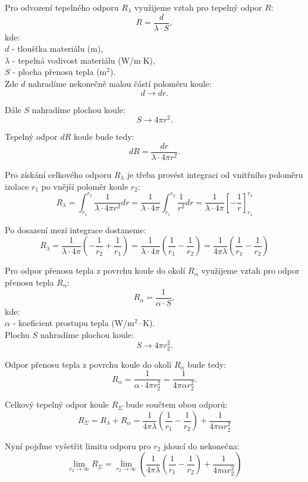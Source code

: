 \documentclass{article}
\begin{document}
Pro odvození tepelného odporu $R_{\lambda}$ využijeme vztah pro tepelný odpor $R$:
$$
    R = \frac{d}{\lambda \cdot S},
$$
kde:\\
$d$ - tloušťka materiálu (m),\\
$\lambda$ - tepelná vodivost materiálu (W/m$\cdot$K),\\
$S$ - plocha přenosu tepla (m$^2$).\\

Zde $d$ nahradíme nekonečně malou částí poloměru koule:
$$
    d \rightarrow dr.
$$

Dále $S$ nahradíme plochou koule:
$$
    S \rightarrow 4 \pi r^2.
$$

Tepelný odpor $dR$ koule bude tedy:
$$
    dR = \frac{dr}{\lambda \cdot 4 \pi r^2}.
$$

Pro získání celkového odporu $R_{\lambda}$ je třeba provést integraci od vnitřního poloměru izolace $r_1$ po vnější poloměr koule $r_2$:
$$
    R_{\lambda} = \int_{r_1}^{r_2} \frac{1}{\lambda \cdot 4 \pi r^2} dr = \frac{1}{\lambda \cdot 4 \pi} \int_{r_1}^{r_2} \frac{1}{r^2} dr = \frac{1}{\lambda \cdot 4 \pi} \left[ -\frac{1}{r} \right]_{r_1}^{r_2}
$$

Po dosazení mezí integrace dostaneme:
$$
    R_{\lambda} = \frac{1}{\lambda \cdot 4 \pi} \left( -\frac{1}{r_2} + \frac{1}{r_1} \right) = \frac{1}{\lambda \cdot 4 \pi} \left( \frac{1}{r_1} - \frac{1}{r_2} \right) = \frac{1}{4 \pi \lambda} \left( \frac{1}{r_1} - \frac{1}{r_2} \right)
$$

Pro odpor přenosu tepla z povrchu koule do okolí $R_{\alpha}$ využijeme vztah pro odpor přenosu tepla $R_{\alpha}$:
$$
    R_{\alpha} = \frac{1}{\alpha \cdot S},
$$
kde:\\
$\alpha$ - koeficient prostupu tepla (W/m$^2 \cdot$K).\\

Plochu $S$ nahradíme plochou koule:
$$
    S \rightarrow 4 \pi r_2^2.
$$

Odpor přenosu tepla z povrchu koule do okolí $R_{\alpha}$ bude tedy:
$$
    R_{\alpha} = \frac{1}{\alpha \cdot 4 \pi r_2^2} = \frac{1}{4 \pi \alpha r_2^2}.
$$

Celkový tepelný odpor koule $R_{\Sigma}$ bude součtem obou odporů:
$$
    R_{\Sigma} = R_{\lambda} + R_{\alpha} = \frac{1}{4 \pi \lambda} \left( \frac{1}{r_1} - \frac{1}{r_2} \right) + \frac{1}{4 \pi \alpha r_2^2}
$$

Nyní pojďme vyšetřit limitu odporu pro $r_2$ jdoucí do nekonečna:
$$
    \lim_{r_2 \to \infty} R_{\Sigma} = \lim_{r_2 \to \infty} \left( \frac{1}{4 \pi \lambda} \left( \frac{1}{r_1} - \frac{1}{r_2} \right) + \frac{1}{4 \pi \alpha r_2^2} \right)
$$
\end{document}
